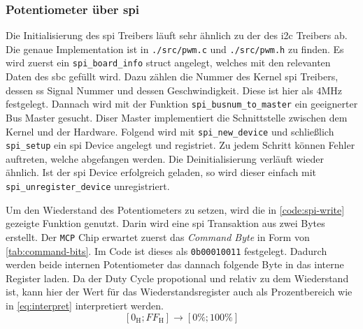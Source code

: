 \subsubsection{Potentiometer über \acrshort{spi}}

Die Initialisierung des \gls{spi} Treibers läuft sehr ähnlich zu der des \gls{i2c} Treibers ab.
Die genaue Implementation ist in \texttt{./src/pwm.c} und \texttt{./src/pwm.h} zu finden.
Es wird zuerst ein \texttt{spi\_board\_info} struct angelegt, welches mit den relevanten Daten des \gls{sbc} gefüllt wird.
Dazu zählen die Nummer des Kernel \gls{spi} Treibers, dessen \gls{ss} Signal Nummer und dessen Geschwindigkeit.
Diese ist hier als $4\si{\mega\hertz}$ festgelegt.
Dannach wird mit der Funktion \texttt{spi\_busnum\_to\_master} ein geeignerter Bus Master gesucht.
Diser Master implementiert die Schnittstelle zwischen dem Kernel und der Hardware.
Folgend wird mit \texttt{spi\_new\_device} und schließlich \texttt{spi\_setup} ein \gls{spi} Device angelegt und registriet.
Zu jedem Schritt können Fehler auftreten, welche abgefangen werden.
Die Deinitialisierung verläuft wieder ähnlich.
Ist der \gls{spi} Device erfolgreich geladen, so wird dieser einfach mit \texttt{spi\_unregister\_device} unregistriert.

Um den Wiederstand des Potentiometers zu setzen, wird die in \autoref{code:spi-write} gezeigte Funktion genutzt.
Darin wird eine \gls{spi} Transaktion aus zwei Bytes erstellt.
Der \texttt{MCP} Chip erwartet zuerst das \textit{Command Byte} in Form von \autoref{tab:command-bits}.
Im Code ist dieses als \texttt{0b00010011} festgelegt.
Dadurch werden beide internen Potentiometer das dannach folgende Byte in das interne Register laden.
Da der Duty Cycle propotional und relativ zu dem Wiederstand ist, kann hier der Wert für das Wiederstandsregister auch als Prozentbereich wie in \autoref{eq:interpret} interpretiert werden.
\begin{equation}
    \left[0_{\text{H}}; FF_{\text{H}}\right] \rightarrow \left[0\%; 100\%\right]
    \label{eq:interpret}
\end{equation}



